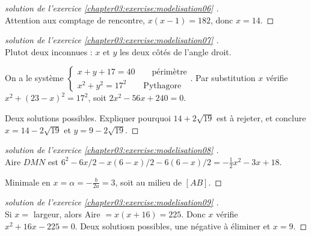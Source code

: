 \documentclass[main.tex]{subfiles}
\begin{document}
\begin{proof}[solution de l'exercice \ref{chapter03:exercise:modelisation06} ]\hfill \\
Attention aux comptage de rencontre, $x(x-1)=182$, donc $x=14$. 
\end{proof}
\begin{proof}[solution de l'exercice \ref{chapter03:exercise:modelisation07} ]\hfill \\
Plutot deux inconnues : $x$ et $y$ les deux côtés de l'angle droit.

On a le système $\begin{cases}
		x+y+17=40 \qquad \text{périmètre}\\
		x^2+y^2=17^2 \qquad \text{Pythagore}
	\end{cases}$. Par substitution $x$ vérifie $x^2+(23-x)^2=17^2$, soit $2x^2-56x+ 240=0$.

Deux solutions possibles. Expliquer pourquoi $14+2\sqrt{19}$ est à rejeter, et conclure $x=14-2\sqrt{19}$ et $y=9-2\sqrt{19}$.
\end{proof}
\begin{proof}[solution de l'exercice \ref{chapter03:exercise:modelisation08} ]\hfill \\
Aire $DMN$ est $6^2-6x/2-x(6-x)/2-6(6-x)/2=-\tfrac{1}{2}x^2-3x+18$.

Minimale en $x=\alpha=-\frac{b}{2a}=3$, soit au milieu de $[AB]$.
\end{proof}
\begin{proof}[solution de l'exercice \ref{chapter03:exercise:modelisation09} ]\hfill \\
Si $x=$ largeur, 	 alors Aire $=x(x+16)=225$. Donc $x$ vérifie $x^2+16x-225=0$. Deux solutiosn possibles, une négative à éliminer et $x=9$.
\end{proof}
\end{document}
